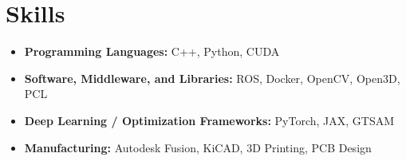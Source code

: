 \documentclass[11pt]{article}
\begin{document}
\section{Skills}
\begin{itemize}
  \item \textbf{Programming Languages:} C++, Python, CUDA
  \item \textbf{Software, Middleware, and Libraries:} ROS, Docker, OpenCV, Open3D, PCL
  \item \textbf{Deep Learning / Optimization Frameworks:} PyTorch, JAX, GTSAM
  \item \textbf{Manufacturing:} Autodesk Fusion, KiCAD, 3D Printing, PCB Design
\end{itemize}
\end{document}
